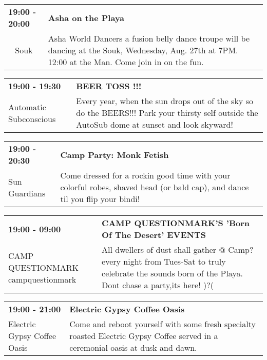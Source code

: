 \begin{tabular}{ p{1in} p{2.2in} }
    \textbf{19:00 - 20:00} & \textbf{Asha on the Playa} \\
    ~ \newline Souk & Asha World Dancers a fusion belly dance troupe will be dancing at the Souk, Wednesday, Aug. 27th at 7PM. 12:00 at the Man.  Come join in on the fun. \\
    \hline 
\end{tabular}
    
\begin{tabular}{ p{1in} p{2.2in} }
    \textbf{19:00 - 19:30} & \textbf{BEER TOSS !!!} \\
    Automatic Subconscious \newline  & Every year, when the sun drops out of the sky so do the BEERS!!! Park your thirsty self outside the AutoSub dome at sunset and look skyward! \\
    \hline 
\end{tabular}
    
\begin{tabular}{ p{1in} p{2.2in} }
    \textbf{19:00 - 20:30} & \textbf{Camp Party: Monk Fetish} \\
    Sun Guardians \newline  & Come dressed for a rockin good time with your colorful robes, shaved head (or bald cap), and dance til you flip your bindi! \\
    \hline 
\end{tabular}
    
\begin{tabular}{ p{1in} p{2.2in} }
    \textbf{19:00 - 09:00} & \textbf{CAMP QUESTIONMARK'S 'Born Of The Desert' EVENTS  } \\
    CAMP QUESTIONMARK \newline campquestionmark & All dwellers of dust shall gather @ Camp? every night from Tues-Sat to truly celebrate the sounds born of the Playa. Dont chase a party,its here!
)?( \\
    \hline 
\end{tabular}
    
\begin{tabular}{ p{1in} p{2.2in} }
    \textbf{19:00 - 21:00} & \textbf{Electric Gypsy Coffee Oasis} \\
    Electric Gypsy Coffee Oasis \newline  & Come and reboot yourself with some fresh specialty roasted Electric Gypsy Coffee served in a ceremonial oasis at dusk and dawn. \\
    \hline 
\end{tabular}
    
